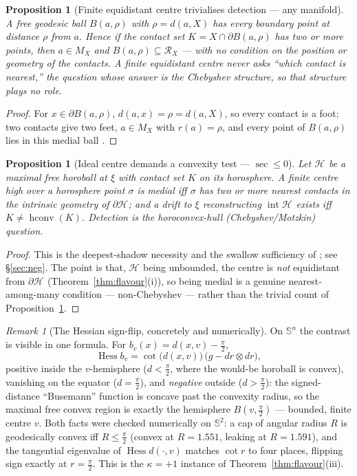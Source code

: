 \documentclass[11pt]{article}
\newtheorem{proposition}[theorem]{Proposition}
\theoremstyle{remark}
\newtheorem{remark}[theorem]{Remark}
\newcommand{\X}{X}
\newcommand{\Mx}{M_{\X}}
\newcommand{\Rx}{\mathcal{R}_{\X}}
\newcommand{\Hb}[1]{\mathcal{H}_{#1}}
\newcommand{\hconv}{\operatorname{hconv}}
\newcommand{\sect}{\operatorname{sec}}
\newcommand{\Hess}{\operatorname{Hess}}
\newcommand{\Sn}{\mathbb{S}^{n}}
\begin{document}
\begin{proposition}[Finite equidistant centre trivialises detection ---
any manifold]\label{prop:finite}
A free geodesic ball $B(a,\rho)$ with $\rho=d(a,\X)$ has \emph{every}
boundary point at distance $\rho$ from $a$. Hence if the contact set
$K=\X\cap\partial B(a,\rho)$ has two or more points, then $a\in\Mx$ and
$B(a,\rho)\subseteq\Rx$ --- with no condition on the position or geometry
of the contacts. A finite equidistant centre never asks ``which contact is
nearest,'' the question whose answer is the Chebyshev structure, so that
structure plays no role.
\end{proposition}

\begin{proof}
For $x\in\partial B(a,\rho)$, $d(a,x)=\rho=d(a,\X)$, so every contact is a
foot; two contacts give two feet, $a\in\Mx$ with $r(a)=\rho$, and every
point of $B(a,\rho)$ lies in this medial ball
\cite[Lem.~3.1, Prop.~3.3]{Sph}.
\end{proof}

\begin{proposition}[Ideal centre demands a convexity test ---
$\sect\le0$]\label{prop:ideal}
Let $\Hb{}$ be a maximal free horoball at $\xi$ with contact set $K$ on its
horosphere. A finite centre high over a horosphere point $\sigma$ is medial
iff $\sigma$ has two or more nearest contacts in the intrinsic geometry of
$\partial\Hb{}$; and a drift to $\xi$ reconstructing
$\operatorname{int}\Hb{}$ exists iff $K\neq\hconv(K)$. Detection is the
horoconvex-hull \textup{(}Chebyshev/Motzkin\textup{)} question.
\end{proposition}

\begin{proof}
This is the deepest-shadow necessity and the swallow sufficiency of
\cite[Thm.~3.3]{R3}; see \S\ref{sec:neg}. The point is that, $\Hb{}$ being
unbounded, the centre is \emph{not} equidistant from $\partial\Hb{}$
(Theorem~\ref{thm:flavour}(i)), so being medial is a genuine
nearest-among-many condition --- non-Chebyshev --- rather than the trivial
count of Proposition~\ref{prop:finite}.
\end{proof}

\begin{remark}[The Hessian sign-flip, concretely and numerically]
\label{rem:flip}
On $\Sn$ the contrast is visible in one formula. For $b_{v}(x)=d(x,v)
-\tfrac\pi2$,
\[
  \Hess b_{v}=\cot\!\bigl(d(x,v)\bigr)\,\bigl(g-dr\otimes dr\bigr),
\]
positive inside the $v$-hemisphere ($d<\tfrac\pi2$, where the would-be
horoball is convex), vanishing on the equator ($d=\tfrac\pi2$), and
\emph{negative} outside ($d>\tfrac\pi2$): the signed-distance ``Busemann''
function is concave past the convexity radius, so the maximal free convex
region is exactly the hemisphere $B(v,\tfrac\pi2)$ --- bounded, finite
centre $v$. Both facts were checked numerically on $\mathbb{S}^{2}$: a cap
of angular radius $R$ is geodesically convex iff $R\le\tfrac\pi2$ (convex
at $R=1.551$, leaking at $R=1.591$), and the tangential eigenvalue of
$\Hess d(\cdot,v)$ matches $\cot r$ to four places, flipping sign exactly
at $r=\tfrac\pi2$. This is the $\kappa=+1$ instance of
Theorem~\ref{thm:flavour}(iii).
\end{remark}
\end{document}
